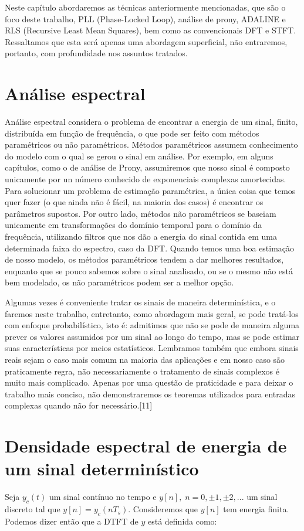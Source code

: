 \documentclass[a4paper, 12pt]{book}
\begin{document}
Neste capítulo abordaremos as técnicas anteriormente mencionadas, que são o foco deste trabalho, PLL (Phase-Locked Loop), análise de prony, ADALINE e RLS (Recursive Least Mean Squares), bem como as convencionais DFT e STFT. Ressaltamos que esta será apenas uma abordagem superficial, não entraremos, portanto, com profundidade nos assuntos tratados.

\section{Análise espectral}
Análise espectral considera o problema de encontrar a energia de um sinal, finito, distribuída em função de frequência, o que pode ser feito com métodos paramétricos ou não paramétricos. Métodos paramétricos assumem conhecimento do modelo com o qual se gerou o sinal em análise. Por exemplo, em alguns capítulos, como o de análise de Prony, assumiremos que nosso sinal é composto unicamente por un número conhecido de exponenciais complexas amortecidas. Para solucionar um problema de estimação paramétrica, a única coisa que temos quer fazer (o que ainda não é fácil, na maioria dos casos) é encontrar os parâmetros supostos. Por outro lado, métodos não paramétricos se baseiam unicamente em transformações do domínio temporal para o domínio da frequência, utilizando filtros que nos dão a energia do sinal contida em uma determinada faixa do espectro, caso da DFT. Quando temos uma boa estimação de nosso modelo, os métodos paramétricos tendem a dar melhores resultados, enquanto que se pouco sabemos sobre o sinal analisado, ou se o mesmo não está bem modelado, os não paramétricos podem ser a melhor opção.

\indent Algumas vezes é conveniente tratar os sinais de maneira determinística, e o faremos neste trabalho, entretanto, como abordagem mais geral, se pode tratá-los com enfoque probabilístico, isto é: admitimos que não se pode de maneira alguma prever os valores assumidos por um sinal ao longo do tempo, mas se pode estimar suas características por meios estatísticos.
\indent Lembramos também que embora sinais reais sejam o caso mais comum na maioria das aplicações e em nosso caso são praticamente regra, não necessariamente o tratamento de sinais complexos é muito mais complicado. Apenas por uma questão de praticidade e para deixar o trabalho mais conciso, não demonstraremos os teoremas utilizados para entradas complexas quando não for necessário.[11]

\section{Densidade espectral de energia de um sinal determinístico}
Seja $y_c(t)$ um sinal contínuo no tempo e $y[n], \; n=0, \pm 1, \pm 2,...$  um sinal discreto tal que $y[n]=y_c(nT_s)$. Consideremos que $y[n]$ tem energia finita. Podemos dizer então que a DTFT de $y$ está definida como:
\end{document}
